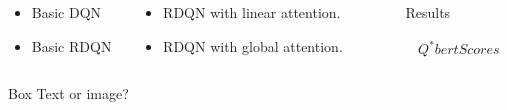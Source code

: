 \documentclass[final]{beamer}
\newlength{\sepwid}
\newlength{\onecolwid}
\newlength{\twocolwid}
\begin{document}
\begin{frame}[t]
\begin{columns}[t]
\begin{column}{\twocolwid}
\begin{columns}[t,totalwidth=\twocolwid]
\begin{column}{\onecolwid}
\begin{itemize}
    \item Basic DQN
    \item Basic RDQN
\end{itemize}


\end{column} %

\begin{column}{\onecolwid} %

\begin{itemize}
    \item RDQN with linear attention.
    \item RDQN with global attention.
\end{itemize}


\end{column} %

\end{columns} %

\begin{alertblock}{Box}
    Text or image?
\end{alertblock} 

\end{column} %

\begin{column}{\sepwid}\end{column} %

\begin{column}{\onecolwid} %


\begin{block}{Results}

\begin{gather*}
	Q^{\ast}bert Scores
\end{gather*}


\end{block}
\end{column}
\end{columns}
\end{frame}
\end{document}
